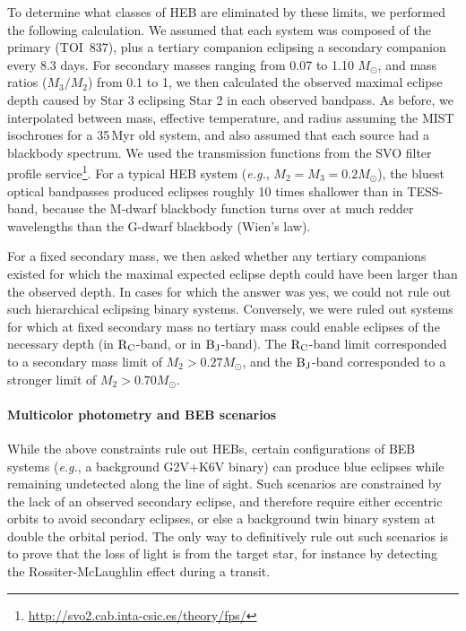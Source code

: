 \documentclass[12pt,twocolumn,tighten]{aastex63}
\newcommand{\tn}{TOI~837} %
\begin{document}
To determine what classes of HEB are eliminated by these limits, we
performed the following calculation.  We assumed that each system was
composed of the primary (\tn), plus a tertiary companion eclipsing a
secondary companion every 8.3 days.  For secondary masses ranging from
0.07 to 1.10 $M_\odot$, and mass ratios ($M_3/M_2$) from 0.1 to 1, we
then calculated the observed maximal eclipse depth caused by Star 3
eclipsing Star 2 in each observed bandpass.  As before, we
interpolated between mass, effective temperature, and radius assuming
the MIST isochrones for a 35$\,$Myr old system, and also assumed that
each source had a blackbody spectrum.  We used the transmission
functions from the SVO filter profile
service\footnote{\url{http://svo2.cab.inta-csic.es/theory/fps/}}.  For
a typical HEB system ({\it e.g.}, $M_2=M_3=0.2M_\odot$), the bluest
optical bandpasses produced eclipses roughly 10 times shallower than
in TESS-band, because the M-dwarf blackbody function turns over at
much redder wavelengths than the G-dwarf blackbody (Wien's law).

For a fixed secondary mass, we then asked whether any tertiary
companions existed for which the maximal expected eclipse depth could
have been larger than the observed depth.  In cases for which the
answer was yes, we could not rule out such hierarchical eclipsing
binary systems.  Conversely, we were ruled out systems for which at
fixed secondary mass no tertiary mass could enable eclipses of the
necessary depth (in ${\rm R_C}$-band, or in ${\rm B_J}$-band).  The
${\rm R_C}$-band limit corresponded to a secondary mass limit of $M_2
> 0.27 M_\odot$, and the ${\rm B_J}$-band corresponded to a stronger
limit of $M_2 > 0.70 M_\odot$.


\paragraph{Multicolor photometry and BEB scenarios}

While the above constraints rule out HEBs, certain configurations of
BEB systems ({\it e.g.}, a background G2V+K6V binary) can produce blue
eclipses while remaining undetected along the line of sight.  Such
scenarios are constrained by the lack of an observed secondary
eclipse, and therefore require either eccentric orbits to avoid
secondary eclipses, or else a background twin binary system at double
the orbital period.  The only way to definitively rule out such
scenarios is to prove that the loss of light is from the target star,
for instance by detecting the Rossiter-McLaughlin effect during a
transit.
\end{document}
